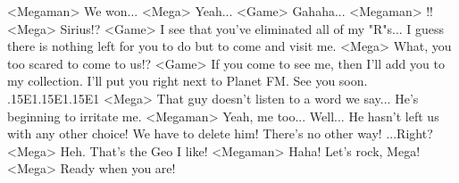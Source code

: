<Megaman> We won... 
<Mega> Yeah... 
<Game> Gahaha... 
<Megaman> !! 
<Mega> Sirius!? 
<Game> I see that you've eliminated all of my "R"s... 
I guess there is nothing left for you to do but to come and visit me. 
<Mega> What, you too scared to come to us!? 
<Game> If you come to see me, then I'll add you to my collection. 
I'll put you right next to Planet FM. 
See you soon. 
.{15}{E1}.{15}{E1}.{15}{E1} 
<Mega> That guy doesn't listen to a word we say... He's beginning to irritate me. 
<Megaman> Yeah, me too... Well... He hasn't left us with any other choice! 
We have to delete him! 
There's no other way! ...Right? 
<Mega> Heh. That's the Geo I like! 
<Megaman> Haha! 
Let's rock, Mega! 
<Mega> Ready when you are! 
